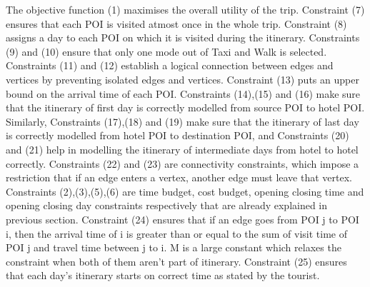 {The objective function (1) maximises the overall utility of the trip. Constraint (7) ensures that each POI is visited atmost once in the whole trip. Constraint (8) assigns a day to each POI on which it is visited during the itinerary. Constraints (9) and (10) ensure that only one mode out of Taxi and Walk is selected. Constraints (11) and (12) establish a logical connection between edges and vertices by preventing isolated edges and vertices. Constraint (13) puts an upper bound on the arrival time of each POI. Constraints (14),(15) and (16) make sure that the itinerary of first day is correctly modelled from source POI to hotel POI. Similarly, Constraints (17),(18) and (19) make sure that the itinerary of last day is correctly modelled from hotel POI to destination POI, and Constraints (20) and (21) help in modelling the itinerary of intermediate days from hotel to hotel correctly. Constraints (22) and (23) are connectivity constraints, which impose a restriction that if an edge enters a vertex, another edge must leave that vertex. Constraints (2),(3),(5),(6) are time budget, cost budget, opening closing time and opening closing day constraints respectively that are already explained in previous section. Constraint (24) ensures that if an edge goes from POI j to POI i, then the arrival time of i is greater than or equal to the sum of visit time of POI j and travel time between j to i. M is a large constant which relaxes the constraint when both of them aren't part of itinerary. Constraint (25) ensures that each day's itinerary starts on correct time as stated by the tourist.

}

